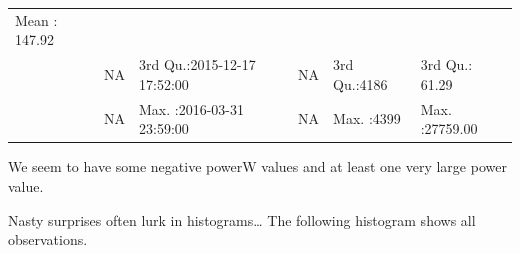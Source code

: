 \documentclass[]{article}
\begin{document}
\begin{longtable}[]{@{}llllll@{}}
\begin{minipage}[t]{0.15\columnwidth}
Mean : 147.92\strut
\end{minipage}\tabularnewline
\begin{minipage}[t]{0.03\columnwidth}\raggedright\strut
\strut
\end{minipage} & \begin{minipage}[t]{0.15\columnwidth}\raggedright\strut
NA\strut
\end{minipage} & \begin{minipage}[t]{0.24\columnwidth}\raggedright\strut
3rd Qu.:2015-12-17 17:52:00\strut
\end{minipage} & \begin{minipage}[t]{0.15\columnwidth}\raggedright\strut
NA\strut
\end{minipage} & \begin{minipage}[t]{0.12\columnwidth}\raggedright\strut
3rd Qu.:4186\strut
\end{minipage} & \begin{minipage}[t]{0.15\columnwidth}\raggedright\strut
3rd Qu.: 61.29\strut
\end{minipage}\tabularnewline
\begin{minipage}[t]{0.03\columnwidth}\raggedright\strut
\strut
\end{minipage} & \begin{minipage}[t]{0.15\columnwidth}\raggedright\strut
NA\strut
\end{minipage} & \begin{minipage}[t]{0.24\columnwidth}\raggedright\strut
Max. :2016-03-31 23:59:00\strut
\end{minipage} & \begin{minipage}[t]{0.15\columnwidth}\raggedright\strut
NA\strut
\end{minipage} & \begin{minipage}[t]{0.12\columnwidth}\raggedright\strut
Max. :4399\strut
\end{minipage} & \begin{minipage}[t]{0.15\columnwidth}\raggedright\strut
Max. :27759.00\strut
\end{minipage}\tabularnewline
\bottomrule
\end{longtable}

We seem to have some negative powerW values and at least one very large
power value.

Nasty surprises often lurk in histograms\ldots{} The following histogram
shows all observations.
\end{document}
